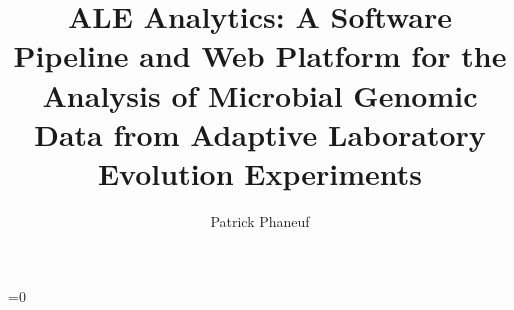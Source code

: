 %
%
%
%



\title{ALE Analytics: A Software Pipeline and Web Platform for the Analysis of Microbial Genomic Data from Adaptive Laboratory Evolution Experiments}

\author{Patrick Phaneuf}
\degreeyear{\the\year}


\degreetitle{\thedegree}


%

 \ifnum{}=0 %
\else
\fi

